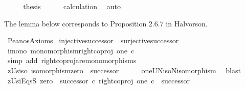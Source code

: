 \begin{isabellebody}
\ \ \isamarkupfalse%
\ \isamarkupfalse%
\ {\isacharquery}{\kern0pt}thesis\isanewline
\ \ \ \ \isamarkupfalse%
\ calculation\ \isamarkupfalse%
\ auto\isanewline
{}\isamarkupfalse%
%
\endisatagproof
{\isafoldproof}%
%
\isadelimproof
%
\endisadelimproof
%
\isadelimdocument
%
\endisadelimdocument
%
\isatagdocument
%
\isamarkuptrue%
%
\endisatagdocument
{\isafolddocument}%
%
\isadelimdocument
%
\endisadelimdocument
%
\begin{isamarkuptext}%
The lemma below corresponds to Proposition 2.6.7 in Halvorson.%
\end{isamarkuptext}\isamarkuptrue%
\isamarkupfalse%
\ Peano{\isacharprime}{\kern0pt}s{\isacharunderscore}{\kern0pt}Axioms{\isacharcolon}{\kern0pt}\isanewline
\ {\isachardoublequoteopen}injective{\isacharparenleft}{\kern0pt}successor{\isacharparenright}{\kern0pt}\ {\isasymand}\ {\isasymnot}surjective{\isacharparenleft}{\kern0pt}successor{\isacharparenright}{\kern0pt}{\isachardoublequoteclose}\isanewline
%
\isadelimproof
%
\endisadelimproof
%
\isatagproof
{}\isamarkupfalse%
\ {\isacharminus}{\kern0pt}\ \isanewline
\ \ \isamarkupfalse%
\ i{}{\isacharunderscore}{\kern0pt}mono{\isacharcolon}{\kern0pt}\ {\isachardoublequoteopen}monomorphism{\isacharparenleft}{\kern0pt}right{\isacharunderscore}{\kern0pt}coproj\ one\ {\isasymnat}\isactrlsub c{\isacharparenright}{\kern0pt}{\isachardoublequoteclose}\isanewline
\ \ \ \ \isamarkupfalse%
\ {\isacharparenleft}{\kern0pt}simp\ add{\isacharcolon}{\kern0pt}\ right{\isacharunderscore}{\kern0pt}coproj{\isacharunderscore}{\kern0pt}are{\isacharunderscore}{\kern0pt}monomorphisms{\isacharparenright}{\kern0pt}\isanewline
\ \ \isamarkupfalse%
\ zUs{\isacharunderscore}{\kern0pt}iso{\isacharcolon}{\kern0pt}\ {\isachardoublequoteopen}isomorphism{\isacharparenleft}{\kern0pt}zero\ {\isasymamalg}\ successor{\isacharparenright}{\kern0pt}{\isachardoublequoteclose}\isanewline
\ \ \ \ \isamarkupfalse%
\ oneUN{\isacharunderscore}{\kern0pt}iso{\isacharunderscore}{\kern0pt}N{\isacharunderscore}{\kern0pt}isomorphism\ \isamarkupfalse%
\ blast\isanewline
\ \ \isamarkupfalse%
\ zUsi{}EqsS{\isacharcolon}{\kern0pt}\ {\isachardoublequoteopen}{\isacharparenleft}{\kern0pt}zero\ {\isasymamalg}\ successor{\isacharparenright}{\kern0pt}\ {\isasymcirc}\isactrlsub c\ {\isacharparenleft}{\kern0pt}right{\isacharunderscore}{\kern0pt}coproj\ one\ {\isasymnat}\isactrlsub c{\isacharparenright}{\kern0pt}\ {\isacharequal}{\kern0pt}\ successor{\isachardoublequoteclose}\isanewline

\end{isabellebody}
